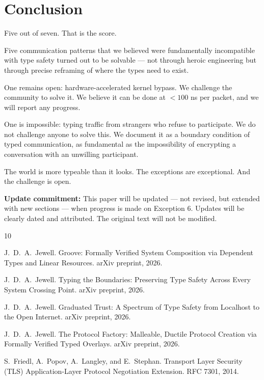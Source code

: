 \documentclass[11pt,a4paper]{article}
\begin{document}
\section{Conclusion}

Five out of seven. That is the score.

Five communication patterns that we believed were fundamentally
incompatible with type safety turned out to be solvable --- not through
heroic engineering but through precise reframing of where the types
need to exist.

One remains open: hardware-accelerated kernel bypass. We challenge the
community to solve it. We believe it can be done at $< 100$ ns per
packet, and we will report any progress.

One is impossible: typing traffic from strangers who refuse to
participate. We do not challenge anyone to solve this. We document it
as a boundary condition of typed communication, as fundamental as the
impossibility of encrypting a conversation with an unwilling
participant.

The world is more typeable than it looks. The exceptions are
exceptional. And the challenge is open.

\bigskip
\noindent
\textbf{Update commitment:} This paper will be updated --- not revised,
but extended with new sections --- when progress is made on Exception 6.
Updates will be clearly dated and attributed. The original text will not
be modified.


\begin{thebibliography}{10}

J.~D.~A.~Jewell.
\newblock Groove: Formally Verified System Composition via Dependent Types and
  Linear Resources.
\newblock arXiv preprint, 2026.

J.~D.~A.~Jewell.
\newblock Typing the Boundaries: Preserving Type Safety Across Every System
  Crossing Point.
\newblock arXiv preprint, 2026.

J.~D.~A.~Jewell.
\newblock Graduated Trust: A Spectrum of Type Safety from Localhost to the Open
  Internet.
\newblock arXiv preprint, 2026.

J.~D.~A.~Jewell.
\newblock The Protocol Factory: Malleable, Ductile Protocol Creation via
  Formally Verified Typed Overlays.
\newblock arXiv preprint, 2026.

S.~Friedl, A.~Popov, A.~Langley, and E.~Stephan.
\newblock Transport Layer Security (TLS) Application-Layer Protocol Negotiation
  Extension.
\newblock RFC 7301, 2014.

\end{thebibliography}
\end{document}

